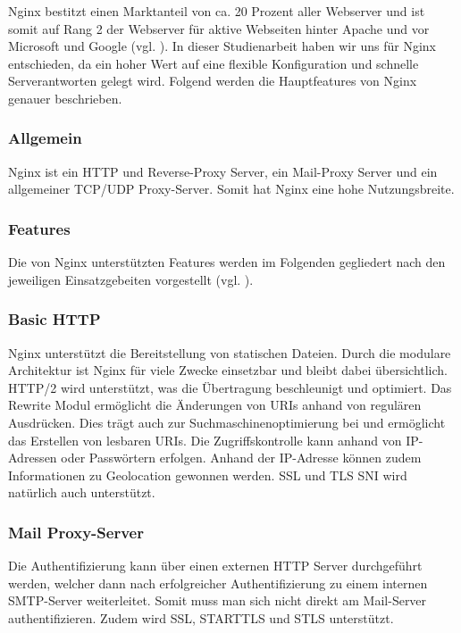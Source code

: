 Nginx bestitzt einen Marktanteil von ca. 20 Prozent aller Webserver und ist somit auf Rang 2 der Webserver für aktive Webseiten hinter Apache und vor Microsoft und Google (vgl. \cite{.k}). In dieser Studienarbeit haben wir uns für Nginx entschieden, da ein hoher Wert auf eine flexible Konfiguration und schnelle Serverantworten gelegt wird. Folgend werden die Hauptfeatures von Nginx genauer beschrieben.

\subsubsection{Allgemein}
\label{sec:NginxAllgemein}
Nginx ist ein HTTP und Reverse-Proxy Server, ein Mail-Proxy Server und ein allgemeiner TCP/UDP Proxy-Server. Somit hat Nginx eine hohe Nutzungsbreite.

\subsubsection{Features}
\label{sec:NginxFeatures}
Die von Nginx unterstützten Features werden im Folgenden gegliedert nach den jeweiligen Einsatzgebeiten vorgestellt (vgl. \cite{.14.03.2017}). 


\subsubsection{Basic HTTP}
\label{sec:NginxBasicHTTP}
Nginx unterstützt die Bereitstellung von statischen Dateien. Durch die modulare Architektur ist Nginx für viele Zwecke einsetzbar und bleibt dabei übersichtlich. HTTP/2 wird unterstützt, was die Übertragung beschleunigt und optimiert. Das Rewrite Modul ermöglicht die Änderungen von URIs anhand von regulären Ausdrücken. Dies trägt auch zur Suchmaschinenoptimierung bei und ermöglicht das Erstellen von lesbaren URIs. Die Zugriffskontrolle kann anhand von IP-Adressen oder Passwörtern erfolgen. Anhand der IP-Adresse können zudem Informationen zu Geolocation gewonnen werden. SSL und TLS SNI wird natürlich auch unterstützt.

\subsubsection{Mail Proxy-Server}
\label{sec:NginxMail Proxy-Server}
Die Authentifizierung kann über einen externen HTTP Server durchgeführt werden, welcher dann nach erfolgreicher Authentifizierung zu einem internen SMTP-Server weiterleitet. Somit muss man sich nicht direkt am Mail-Server authentifizieren. Zudem wird SSL, STARTTLS und STLS unterstützt.

